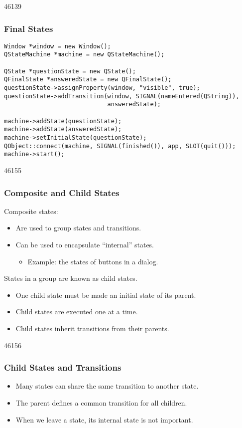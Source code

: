 \begin{slide}[fragile]{46139}\frametitle{Final States}
\vspace*{-0.5em}
\small
\begin{lstlisting}
Window *window = new Window();
QStateMachine *machine = new QStateMachine();

QState *questionState = new QState();
QFinalState *answeredState = new QFinalState();
questionState->assignProperty(window, "visible", true);
questionState->addTransition(window, SIGNAL(nameEntered(QString)),
                             answeredState);

machine->addState(questionState);
machine->addState(answeredState);
machine->setInitialState(questionState);
QObject::connect(machine, SIGNAL(finished()), app, SLOT(quit()));
machine->start();
\end{lstlisting}
\normalsize
{}
\end{slide}

\begin{slide}{46155}\frametitle{Composite and Child States}
\label{Animation-States-Composite}
\vspace*{1.0em}
Composite states:

\begin{itemize}
\item Are used to group states and transitions.
\item Can be used to encapsulate ``internal'' states.
\begin{itemize}
\item Example: the states of buttons in a dialog.
\end{itemize}
\end{itemize}

States in a group are known as child states.

\begin{itemize}
\item One child state must be made an initial state of its parent.
\item Child states are executed one at a time.
\item Child states inherit transitions from their parents.
\end{itemize}
\end{slide}

\begin{slide}{46156}\frametitle{Child States and Transitions}
\vfill

\begin{itemize}
\item Many states can share the same transition to another state.
\item The parent defines a common transition for all children.
\item When we leave a state, its internal state is not important.
\end{itemize}
\end{slide}

